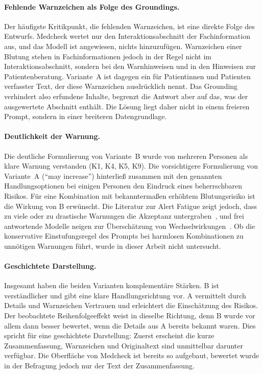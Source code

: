 \paragraph{Fehlende Warnzeichen als Folge des Groundings.} Der häufigste Kritikpunkt, die fehlenden Warnzeichen, ist eine direkte Folge des Entwurfs. Medcheck wertet nur den Interaktionsabschnitt der Fachinformation aus, und das Modell ist angewiesen, nichts hinzuzufügen. Warnzeichen einer Blutung stehen in Fachinformationen jedoch in der Regel nicht im Interaktionsabschnitt, sondern bei den Warnhinweisen und in den Hinweisen zur Patientenberatung. Variante~A ist dagegen ein für Patientinnen und Patienten verfasster Text, der diese Warnzeichen ausdrücklich nennt. Das Grounding verhindert also erfundene Inhalte, begrenzt die Antwort aber auf das, was der ausgewertete Abschnitt enthält. Die Lösung liegt daher nicht in einem freieren Prompt, sondern in einer breiteren Datengrundlage.

\paragraph{Deutlichkeit der Warnung.} Die deutliche Formulierung von Variante~B wurde von mehreren Personen als klare Warnung verstanden (K1, K4, K5, K9). Die vorsichtigere Formulierung von Variante~A (\enquote{may increase}) hinterließ zusammen mit den genannten Handlungsoptionen bei einigen Personen den Eindruck eines beherrschbaren Risikos. Für eine Kombination mit bekanntermaßen erhöhtem Blutungsrisiko ist die Wirkung von B erwünscht. Die Literatur zur Alert Fatigue zeigt jedoch, dass zu viele oder zu drastische Warnungen die Akzeptanz untergraben~\cite{VillaZapata}, und frei antwortende Modelle neigen zur Überschätzung von Wechselwirkungen~\cite{MOHAMMED2026100733}. Ob die konservative Einstufungsregel des Prompts bei harmlosen Kombinationen zu unnötigen Warnungen führt, wurde in dieser Arbeit nicht untersucht.

\paragraph{Geschichtete Darstellung.} Insgesamt haben die beiden Varianten komplementäre Stärken. B ist verständlicher und gibt eine klare Handlungsrichtung vor. A vermittelt durch Details und Warnzeichen Vertrauen und erleichtert die Einschätzung des Risikos. Der beobachtete Reihenfolgeeffekt weist in dieselbe Richtung, denn B wurde vor allem dann besser bewertet, wenn die Details aus A bereits bekannt waren. Dies spricht für eine geschichtete Darstellung: Zuerst erscheint die kurze Zusammenfassung, Warnzeichen und Originaltext sind unmittelbar darunter verfügbar. Die Oberfläche von Medcheck ist bereits so aufgebaut, bewertet wurde in der Befragung jedoch nur der Text der Zusammenfassung.

